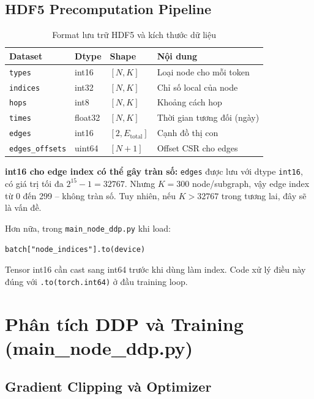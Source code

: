 \documentclass[12pt,a4paper]{article}
\begin{document}
\subsection{HDF5 Precomputation Pipeline}

\begin{table}[H]
\centering\small
\caption{Format lưu trữ HDF5 và kích thước dữ liệu}
\begin{tabular}{llll}
\toprule
\textbf{Dataset} & \textbf{Dtype} & \textbf{Shape} & \textbf{Nội dung} \\
\midrule
\texttt{types} & int16 & $[N, K]$ & Loại node cho mỗi token \\
\texttt{indices} & int32 & $[N, K]$ & Chỉ số local của node \\
\texttt{hops} & int8 & $[N, K]$ & Khoảng cách hop \\
\texttt{times} & float32 & $[N, K]$ & Thời gian tương đối (ngày) \\
\texttt{edges} & int16 & $[2, E_\text{total}]$ & Cạnh đồ thị con \\
\texttt{edges\_offsets} & uint64 & $[N+1]$ & Offset CSR cho edges \\
\bottomrule
\end{tabular}
\end{table}

\begin{issuebox}
\textbf{int16 cho edge index có thể gây tràn số:} \texttt{edges} được lưu
với dtype \texttt{int16}, có giá trị tối đa $2^{15}-1 = 32767$. Nhưng
$K = 300$ node/subgraph, vậy edge index từ 0 đến 299 -- không tràn số.
Tuy nhiên, nếu $K > 32767$ trong tương lai, đây sẽ là vấn đề.

Hơn nữa, trong \texttt{main\_node\_ddp.py} khi load:
\begin{center}
\texttt{batch["node\_indices"].to(device)}
\end{center}
Tensor int16 cần cast sang int64 trước khi dùng làm index. Code xử lý
điều này đúng với \texttt{.to(torch.int64)} ở đầu training loop.
\end{issuebox}

\section{Phân tích DDP và Training (main\_node\_ddp.py)}

\subsection{Gradient Clipping và Optimizer}
\end{document}

